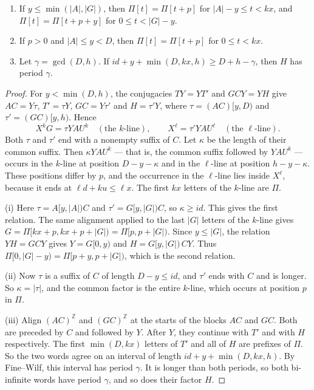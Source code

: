 \begin{lemma}\label{tail:twoper}
\begin{enumerate}
\item[(i)] If \(y\le\min(|A|,|G|)\), then \(\Pi[t]=\Pi[t+p]\) for \(|A|-y\le t<kx\), and \(\Pi[t]=\Pi[t+p+y]\) for \(0\le t<|G|-y\).
\item[(ii)] If \(p>0\) and \(|A|\le y<D\), then \(\Pi[t]=\Pi[t+p]\) for \(0\le t<kx\).
\item[(iii)] Let \(\gamma=\gcd(D,h)\). If \(id+y+\min(D,kx,h)\ge D+h-\gamma\), then \(H\) has period \(\gamma\).
\end{enumerate}
\end{lemma}
\begin{proof}
For \(y<\min(D,h)\), the conjugacies \(TY=YT'\) and \(GCY=YH\) give \(AC=Y\tau\), \(T'=\tau Y\), \(GC=Y\tau'\) and \(H=\tau'Y\), where \(\tau=(AC)[y,D)\) and \(\tau'=(GC)[y,h)\). Hence
\[
X^kG=\tau YAU^k\quad(\text{the }k\text{-line}),\qquad X^\ell=\tau'YAU^\ell\quad(\text{the }\ell\text{-line}).
\]
Both \(\tau\) and \(\tau'\) end with a nonempty suffix of \(C\). Let \(\kappa\) be the length of their common suffix. Then \(\kappa YAU^k\) — that is, the common suffix followed by \(YAU^k\) — occurs in the \(k\)-line at position \(D-y-\kappa\) and in the \(\ell\)-line at position \(h-y-\kappa\). These positions differ by \(p\), and the occurrence in the \(\ell\)-line lies inside \(X^\ell\), because it ends at \(\ell d+ku\le\ell x\). The first \(kx\) letters of the \(k\)-line are \(\Pi\).

(i) Here \(\tau=A[y,|A|)C\) and \(\tau'=G[y,|G|)C\), so \(\kappa\ge id\). This gives the first relation. The same alignment applied to the last \(|G|\) letters of the \(k\)-line gives \(G=\Pi[kx+p,kx+p+|G|)=\Pi[p,p+|G|)\). Since \(y\le|G|\), the relation \(YH=GCY\) gives \(Y=G[0,y)\) and \(H=G[y,|G|)\,CY\). Thus \(\Pi[0,|G|-y)=\Pi[p+y,p+|G|)\), which is the second relation.

(ii) Now \(\tau\) is a suffix of \(C\) of length \(D-y\le id\), and \(\tau'\) ends with \(C\) and is longer. So \(\kappa=|\tau|\), and the common factor is the entire \(k\)-line, which occurs at position \(p\) in \(\Pi\).

(iii) Align \((AC)^{\mathbb Z}\) and \((GC)^{\mathbb Z}\) at the starts of the blocks \(AC\) and \(GC\). Both are preceded by \(C\) and followed by \(Y\). After \(Y\), they continue with \(T'\) and with \(H\) respectively. The first \(\min(D,kx)\) letters of \(T'\) and all of \(H\) are prefixes of \(\Pi\). So the two words agree on an interval of length \(id+y+\min(D,kx,h)\). By Fine--Wilf, this interval has period \(\gamma\). It is longer than both periods, so both bi-infinite words have period \(\gamma\), and so does their factor \(H\).
\end{proof}

